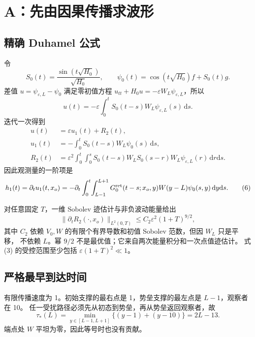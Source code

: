 \documentclass[UTF8,11pt,a4paper]{ctexart}
\theoremstyle{definition}
\newcommand{\norm}[1]{\lVert#1\rVert}
\newcommand{\dd}{\mathrm d}
\newcommand{\eps}{\varepsilon}
\begin{document}
\section{A：先由因果传播求波形}

\subsection{精确 Duhamel 公式}

令
\[
S_0(t)=\frac{\sin(t\sqrt{H_0})}{\sqrt{H_0}},\qquad
\psi_0(t)=\cos(t\sqrt{H_0})f+S_0(t)g.
\]
差值 $u=\psi_{\eps,L}-\psi_0$ 满足零初值方程
$u_{tt}+H_0u=-\eps W_L\psi_{\eps,L}$，所以
\begin{equation}
u(t)=-\eps\int_0^tS_0(t-s)W_L\psi_{\eps,L}(s)\,\dd s.    \tag{2}
\end{equation}
迭代一次得到
\begin{align}
u(t)&=\eps u_1(t)+R_2(t),                                      \tag{3}\\
u_1(t)&=-\int_0^tS_0(t-s)W_L\psi_0(s)\,\dd s,                 \tag{4}\\
R_2(t)&=\eps^2\int_0^t\!\int_0^s
S_0(t-s)W_LS_0(s-r)W_L\psi_{\eps,L}(r)\,\dd r\dd s.          \tag{5}
\end{align}
因此观测量的一阶项是
\begin{equation}
h_1(t)=\partial_tu_1(t,x_o)
=-\partial_t\int_0^t\!\int_{L-1}^{L+1}
G_0^{\rm ret}(t-s;x_o,y)W(y-L)\psi_0(s,y)\,\dd y\dd s.        \tag{6}
\end{equation}

对任意固定 $T$，一维 Sobolev 迹估计与非负波动能量给出
\begin{equation}
\norm{\partial_tR_2(\cdot,x_o)}_{L^2(0,T)}
\le C_2\eps^2(1+T)^{9/2},                                    \tag{7}
\end{equation}
其中 $C_2$ 依赖 $V_0,W$ 的有限个有界导数和初值 Sobolev 范数，但因 $W_L$ 只是平移，
不依赖 $L$。幂 $9/2$ 不是最优值；它来自两次能量积分和一次点值迹估计。
式 (3) 的受控范围至少包括 $\eps(1+T)^2\ll1$。

\subsection{严格最早到达时间}

有限传播速度为 1。初始支撑的最右点是 1，势垒支撑的最左点是 $L-1$，观察者在 10。
任一受扰路径必须先从初态到势垒，再从势垒返回观察者，故
\begin{equation}
\tau_*(L)=\min_{y\in[L-1,L+1]}\{(y-1)+(y-10)\}=2L-13.      \tag{8}
\end{equation}
端点处 $W$ 平坦为零，因此等号时也没有贡献。
\end{document}

